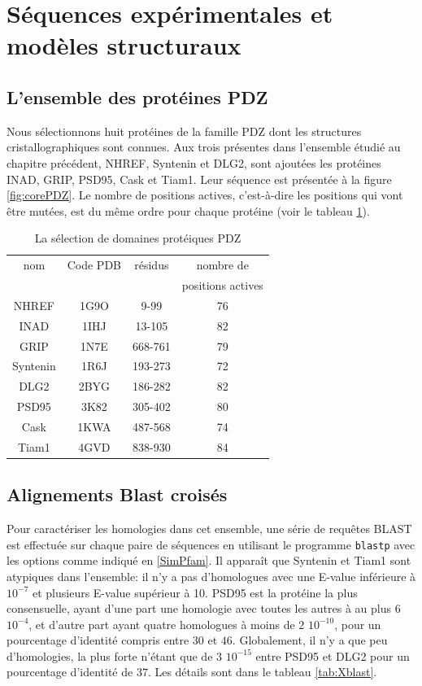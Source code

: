 \section{Séquences expérimentales et modèles structuraux}
\subsection{L'ensemble des protéines PDZ}
Nous sélectionnons huit protéines de la famille PDZ dont les structures cristallographiques sont connues. Aux trois présentes dans l'ensemble étudié au chapitre précédent, NHREF, Syntenin et DLG2, sont ajoutées les protéines INAD, GRIP, PSD95, Cask et Tiam1. Leur séquence est présentée à la figure \ref{fig:corePDZ}. Le nombre de positions actives, c'est-à-dire les positions qui vont être mutées, est du même ordre pour chaque protéine (voir le tableau \ref{tab:protéines_PDZ}).

\begin{table}[!htbp]
  \centering
  \caption{La sélection de domaines protéiques PDZ}
  \begin{tabular}{cccc}
    \toprule
    nom & Code PDB & résidus &  nombre de \\
        &          &         & positions actives \\
    \cmidrule{1-4}
    NHREF    & 1G9O  & 9-99    & 76 \\
    INAD     & 1IHJ  & 13-105  & 82 \\
    GRIP     & 1N7E  & 668-761 & 79 \\
    Syntenin & 1R6J  & 193-273 & 72 \\
    DLG2     & 2BYG  & 186-282 & 82 \\
    PSD95    & 3K82  & 305-402 & 80 \\
    Cask     & 1KWA  & 487-568 & 74 \\
    Tiam1    & 4GVD  & 838-930 & 84 \\
    \bottomrule
    
  \end{tabular}      
  \label{tab:protéines_PDZ}      
\end{table}

\subsection{Alignements Blast croisés}
   
Pour caractériser les homologies dans cet ensemble, une série de requêtes BLAST est effectuée sur chaque paire de séquences en utilisant le programme \verb!blastp! avec les options comme indiqué en \ref{SimPfam}. Il apparaît que Syntenin et Tiam1 sont atypiques dans l'ensemble: il n'y a pas d'homologues avec une E-value inférieure à $10^{-7}$ et plusieurs E-value supérieur à 10. PSD95 est la protéine la plus consensuelle, ayant d'une part une homologie avec toutes les autres à au plus $6$ $10^{-4}$, et d'autre part ayant quatre homologues à moins de $2$ $10^{-10}$, pour un pourcentage d'identité compris entre $30$ et $46$. Globalement, il n'y a que peu d'homologies, la plus forte n'étant que de $3$ $10^{-15}$ entre PSD95 et DLG2 pour un pourcentage d'identité de $37$. Les détails sont dans le tableau \ref{tab:Xblast}.

